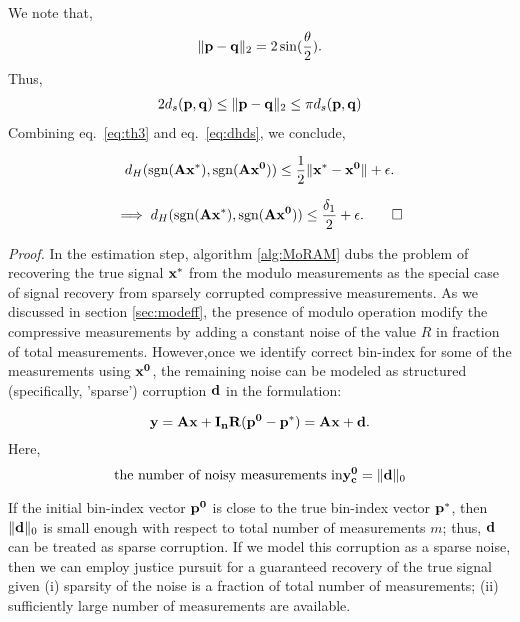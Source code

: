We note that,
$$
\|\mathbf{p-q}\|_2 = 2\sin(\frac{\theta}{2}).
$$
Thus,
\begin{align}
\label{eq:dhds}
2d_s(\mb{p},\mb{q}) \leq \norm{\mb{p - q}}_2 \leq \pi d_s(\mb{p},\mb{q})
\end{align}
Combining eq.~\ref{eq:th3} and eq.~\ref{eq:dhds}, we conclude,

$$
d_H(\mathrm{sgn}({\mathbf{Ax^*}}), \mathrm{sgn}({\mathbf{Ax^0}})) \leq \frac{1}{2}\|\mathbf{x^*-x^0}\| + \epsilon.
$$

\begin{align}
\label{eq:hd}
\implies d_H(\sgn({\mb{Ax^*}}), \sgn({\mb{Ax^0}})) \leq \frac{\delta_1}{2} + \epsilon.
\qed
\end{align}



\textit{Proof.} In the estimation step, algorithm \ref{alg:MoRAM} dubs the problem of recovering the true signal $\mathbf{x^*}$ from the modulo measurements as the special case of signal recovery from sparsely corrupted compressive measurements. As we discussed in section \ref{sec:modeff}, the presence of modulo operation modify the compressive measurements by adding a constant noise of the value $R$ in fraction of total measurements. However,once we identify correct bin-index for some of the measurements using $\mathbf{x^0}$, the remaining noise can be modeled as structured (specifically, 'sparse') corruption $\mathbf{d}$ in the formulation:

$$
\mathbf{y} = \mathbf{Ax} + \mathbf{I_nR(p^0-p^*)} = \mathbf{Ax} + \mathbf{d}.
$$  
Here,
$$
\textnormal{the number of noisy measurements in} \mathbf{y^0_c} = \|\mathbf{d}\|_0
$$

If the initial bin-index vector $\mathbf{p^0}$ is close to the true bin-index vector $\mathbf{p^*}$, then $\|\mathbf{d}\|_0$ is small enough with respect to total number of measurements $m$; thus, $\mathbf{\mathbf{d}}$ can be treated as sparse corruption. If we model this corruption as a sparse noise, then we can employ justice pursuit for a guaranteed recovery of the true signal given (i) sparsity of the noise is a fraction of total number of measurements; (ii) sufficiently large number of measurements are available.  

